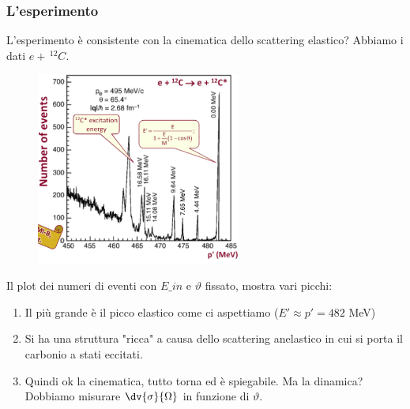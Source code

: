 \subsubsection{L'esperimento}
L'esperimento è consistente con la cinematica dello scattering elastico? Abbiamo i dati $e+\,^{12}C$.
\begin{figure}[H]
    \centering
    \includegraphics[width=0.6\textwidth]{immagini/fig_plot_eN_scatt.png}
\end{figure}
Il plot dei numeri di eventi con $E\_{in}$ e $\vartheta$ fissato, mostra vari picchi:
\begin{enumerate}
    \item Il più grande è il picco elastico come ci aspettiamo ($E'\approx p'=482$ MeV)
    \item Si ha una struttura "ricca" a causa dello scattering anelastico in cui si porta il carbonio a stati eccitati.
    \item Quindi ok la cinematica, tutto torna ed è spiegabile. Ma la dinamica? Dobbiamo misurare $\dv{\sigma}{\Omega}$ in funzione di $\vartheta$.
\end{enumerate}
